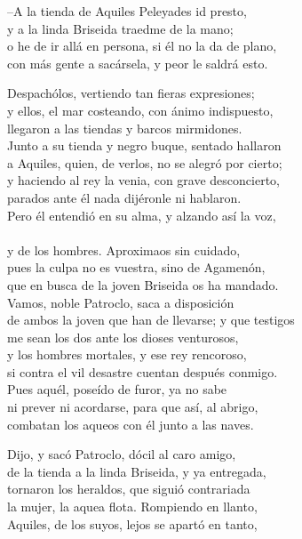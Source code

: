 --A la tienda de Aquiles Peleyades id presto,\\
y a la linda Briseida traedme de la mano;\\
o he de ir allá en persona, si él no la da de plano,\\
con más gente a sacársela, y peor le saldrá esto.\par
Despachólos, vertiendo tan fieras expresiones;\\
y ellos, el mar costeando, con ánimo indispuesto,\\
llegaron a las tiendas y barcos mirmidones.\\
Junto a su tienda y negro buque, sentado hallaron\\
a Aquiles, quien, de verlos, no se alegró por cierto;\\
y haciendo al rey la venia, con grave desconcierto,\\
parados ante él nada dijéronle ni hablaron.\\
Pero él entendió en su alma, y alzando así la voz,\\
\\
y de los hombres. Aproximaos sin cuidado,\\
pues la culpa no es vuestra, sino de Agamenón,\\
que en busca de la joven Briseida os ha mandado.\\
Vamos, noble Patroclo, saca a disposición\\
de ambos la joven que han de llevarse; y que testigos\\
me sean los dos ante los dioses venturosos,\\
y los hombres mortales, y ese rey rencoroso,\\
si contra el vil desastre cuentan después conmigo.\\
Pues aquél, poseído de furor, ya no sabe\\
ni prever ni acordarse, para que así, al abrigo,\\
combatan los aqueos con él junto a las naves.\par
Dijo, y sacó Patroclo, dócil al caro amigo,\\
de la tienda a la linda Briseida, y ya entregada,\\
tornaron los heraldos, que siguió contrariada\\
la mujer, la aquea flota. Rompiendo en llanto,\\
Aquiles, de los suyos, lejos se apartó en tanto,\\
